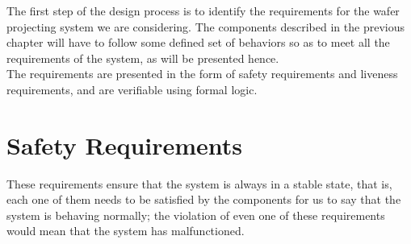 
The first step of the design process is to identify the requirements for the wafer projecting system we are considering. The components described in the previous chapter will have to follow some defined set of behaviors so as to meet all the requirements of the system, as will be presented hence.\\
The requirements are presented in the form of safety requirements and liveness requirements, and are verifiable using formal logic.

\section{Safety Requirements}

These requirements ensure that the system is always in a stable state, that is, each one of them needs to be satisfied by the components for us to say that the system is behaving normally; the violation of even one of these requirements would mean that the system has malfunctioned.


